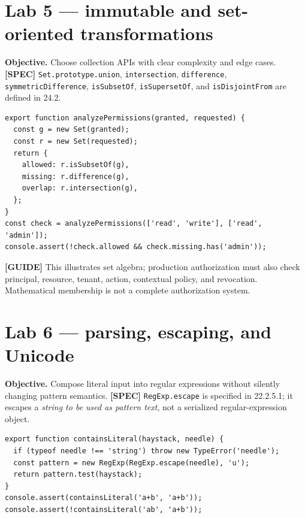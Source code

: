 \documentclass[11pt,letterpaper]{article}
\newcommand{\passthrough}[1]{#1}
\begin{document}
\section{Lab 5 --- immutable and set-oriented transformations}\label{lab-5-immutable-and-set-oriented-transformations}

\textbf{Objective.} Choose collection APIs with clear complexity and edge cases. \textbf{{[}SPEC{]}} \passthrough{\lstinline!Set.prototype.union!}, \passthrough{\lstinline!intersection!}, \passthrough{\lstinline!difference!}, \passthrough{\lstinline!symmetricDifference!}, \passthrough{\lstinline!isSubsetOf!}, \passthrough{\lstinline!isSupersetOf!}, and \passthrough{\lstinline!isDisjointFrom!} are defined in 24.2.

\begin{lstlisting}
export function analyzePermissions(granted, requested) {
  const g = new Set(granted);
  const r = new Set(requested);
  return {
    allowed: r.isSubsetOf(g),
    missing: r.difference(g),
    overlap: r.intersection(g),
  };
}
const check = analyzePermissions(['read', 'write'], ['read', 'admin']);
console.assert(!check.allowed && check.missing.has('admin'));
\end{lstlisting}

\textbf{{[}GUIDE{]}} This illustrates set algebra; production authorization must also check principal, resource, tenant, action, contextual policy, and revocation. Mathematical membership is not a complete authorization system.

\section{Lab 6 --- parsing, escaping, and Unicode}\label{lab-6-parsing-escaping-and-unicode}

\textbf{Objective.} Compose literal input into regular expressions without silently changing pattern semantics. \textbf{{[}SPEC{]}} \passthrough{\lstinline!RegExp.escape!} is specified in 22.2.5.1; it escapes a \emph{string to be used as pattern text}, not a serialized regular-expression object.

\begin{lstlisting}
export function containsLiteral(haystack, needle) {
  if (typeof needle !== 'string') throw new TypeError('needle');
  const pattern = new RegExp(RegExp.escape(needle), 'u');
  return pattern.test(haystack);
}
console.assert(containsLiteral('a+b', 'a+b'));
console.assert(!containsLiteral('ab', 'a+b'));
\end{lstlisting}
\end{document}
